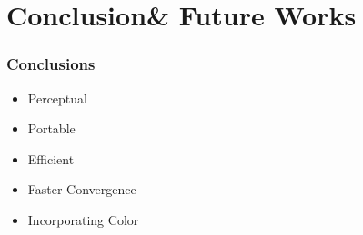 \documentclass{beamer}
\begin{document}
\begin{frame}
		


		


		



			
\end{frame}
\section{Conclusion\& Future Works}
\begin{frame}
	\frametitle{Conclusions}
	\begin{itemize}
		\item<1-> Perceptual
		\item<2-> Portable
		\item<3-> Efficient
		\item<4-> Faster Convergence
		\item<5-> Incorporating Color
			
	\end{itemize}
\end{frame}
\end{document}
